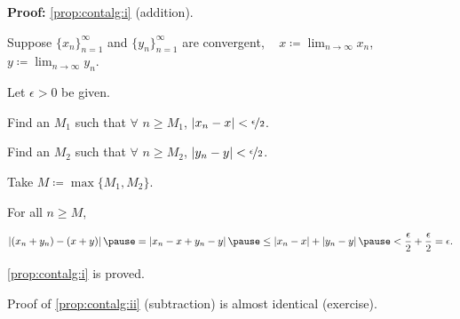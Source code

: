 \documentclass[10pt,aspectratio=149]{beamer}
\begin{document}
\begin{frame}

\textbf{Proof:}
\eqref{prop:contalg:i} (addition).

\pause
\medskip

Suppose $\{ x_n \}_{n=1}^\infty$ and $\{ y_n \}_{n=1}^\infty$ are convergent,
~
$\displaystyle x \coloneqq \lim_{n\to\infty} x_n$,
~
$\displaystyle y \coloneqq \lim_{n\to\infty} y_n$.

\pause
\medskip

Let $\epsilon > 0$ be given.  

\pause
Find an $M_1$ such that $\forall$ $n \geq M_1$,
$\left\lvert {x_n - x} \right\rvert < \nicefrac{\epsilon}{2}$.  

\pause
Find an $M_2$ such that $\forall$ $n \geq M_2$,
$\left\lvert {y_n - y} \right\rvert < \nicefrac{\epsilon}{2}$.

\pause
Take $M \coloneqq \max \{ M_1, M_2 \}$.

\pause
\medskip

For all $n \geq M$,

\pause
\medskip

$\displaystyle
\abs{(x_n+y_n) - (x+y)}
\pause
=
\abs{x_n-x + y_n-y}
\pause
\leq
\abs{x_n-x} + \abs{y_n-y}
\pause
<
\frac{\epsilon}{2} +
\frac{\epsilon}{2}
= \epsilon.
$

\medskip
\pause

\eqref{prop:contalg:i} is proved.

\medskip
\pause

Proof of \eqref{prop:contalg:ii} (subtraction) is almost identical
(exercise).

\end{frame}
\end{document}
